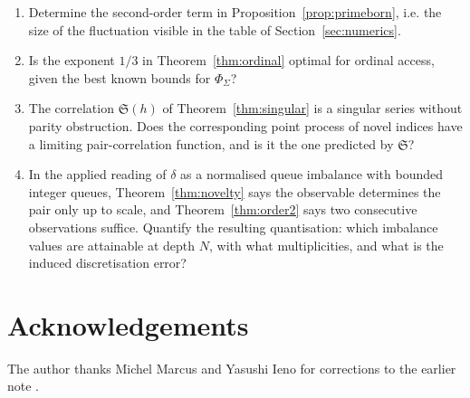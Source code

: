 \documentclass[11pt,a4paper]{article}
\theoremstyle{plain}
\theoremstyle{definition}
\theoremstyle{remark}
\begin{document}
\begin{enumerate}
  \item Determine the second-order term in
    Proposition~\ref{prop:primeborn}, i.e. the size of the fluctuation visible
    in the table of Section~\ref{sec:numerics}.
  \item Is the exponent $1/3$ in Theorem~\ref{thm:ordinal} optimal for ordinal
    access, given the best known bounds for $\Phi_\Sigma$?
  \item The correlation $\mathfrak{S}(h)$ of Theorem~\ref{thm:singular} is a
    singular series without parity obstruction. Does the corresponding point
    process of novel indices have a limiting pair-correlation function, and is it
    the one predicted by $\mathfrak{S}$?
  \item In the applied reading of $\delta$ as a normalised queue imbalance with
    bounded integer queues, Theorem~\ref{thm:novelty} says the observable
    determines the pair only up to scale, and Theorem~\ref{thm:order2} says two
    consecutive observations suffice. Quantify the resulting quantisation:
    which imbalance values are attainable at depth $N$, with what multiplicities,
    and what is the induced discretisation error?
\end{enumerate}

\section*{Acknowledgements}

The author thanks Michel Marcus and Yasushi Ieno for corrections to the earlier
note \cite{Bilokon2025}.
\end{document}
